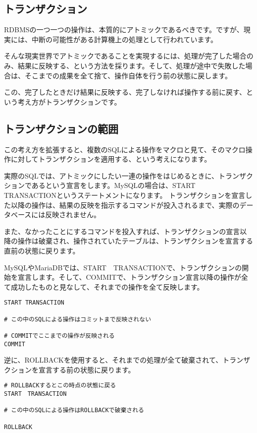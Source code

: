 \subsection{トランザクション}

RDBMSの一つ一つの操作は、本質的にアトミックであるべきです。ですが、現実には、中断の可能性がある計算機上の処理として行われています。

そんな現実世界でアトミックであることを実現するには、処理が完了した場合のみ、結果に反映する、という方法を採ります。そして、処理が途中で失敗した場合は、そこまでの成果を全て捨て、操作自体を行う前の状態に戻します。

この、完了したときだけ結果に反映する、完了しなければ操作する前に戻す、という考え方がトランザクションです。

\subsection{トランザクションの範囲}

この考え方を拡張すると、複数のSQLによる操作をマクロと見て、そのマクロ操作に対してトランザクションを適用する、という考えになります。

実際のSQLでは、アトミックにしたい一連の操作をはじめるときに、トランザクションであるという宣言をします。MySQLの場合は、START　TRANSACTIONというステートメントになります。
トランザクションを宣言した以降の操作は、結果の反映を指示するコマンドが投入されるまで、実際のデータベースには反映されません。

また、なかったことにするコマンドを投入すれば、トランザクションの宣言以降の操作は破棄され、操作されていたテーブルは、トランザクションを宣言する直前の状態に戻ります。

MySQLやMariaDBでは、START　TRANSACTIONで、トランザクションの開始を宣言します。そして、COMMITで、トランザクション宣言以降の操作が全て成功したものと見なして、それまでの操作を全て反映します。

\begin{verbatim}
START TRANSACTION

# この中のSQLによる操作はコミットまで反映されない

# COMMITでここまでの操作が反映される
COMMIT
\end{verbatim}

逆に、ROLLBACKを使用すると、それまでの処理が全て破棄されて、トランザクションを宣言する前の状態に戻ります。

\begin{verbatim}
# ROLLBACKするとこの時点の状態に戻る
START　TRANSACTION

# この中のSQLによる操作はROLLBACKで破棄される

ROLLBACK
\end{verbatim}

